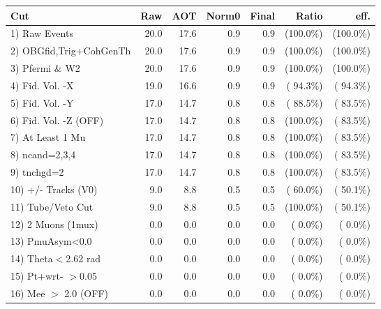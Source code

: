  \begin{table}[h!]\centering
 \begin{tabular}{||l||r|r|r|r|r|r||}
 \hline
 \hline
 Cut & Raw & AOT & Norm0 & Final & Ratio & eff.       \\
 \hline
  1) Raw Events           &         20.0 &         17.6 &          0.9 &          0.9 & (100.0\%) & (100.0\%) \\
  2) OBGfid,Trig+CohGenTh &         20.0 &         17.6 &          0.9 &          0.9 & (100.0\%) & (100.0\%) \\
  3) Pfermi \& W2         &         20.0 &         17.6 &          0.9 &          0.9 & (100.0\%) & (100.0\%) \\
  4) Fid. Vol. -X         &         19.0 &         16.6 &          0.9 &          0.9 & ( 94.3\%) & ( 94.3\%) \\
  5) Fid. Vol. -Y         &         17.0 &         14.7 &          0.8 &          0.8 & ( 88.5\%) & ( 83.5\%) \\
  6) Fid. Vol. -Z (OFF)   &         17.0 &         14.7 &          0.8 &          0.8 & (100.0\%) & ( 83.5\%) \\
  7) At Least 1 Mu        &         17.0 &         14.7 &          0.8 &          0.8 & (100.0\%) & ( 83.5\%) \\
  8) ncand=2,3,4          &         17.0 &         14.7 &          0.8 &          0.8 & (100.0\%) & ( 83.5\%) \\
  9) tnchgd=2             &         17.0 &         14.7 &          0.8 &          0.8 & (100.0\%) & ( 83.5\%) \\
 10) +/- Tracks (V0)      &          9.0 &          8.8 &          0.5 &          0.5 & ( 60.0\%) & ( 50.1\%) \\
 11) Tube/Veto Cut        &          9.0 &          8.8 &          0.5 &          0.5 & (100.0\%) & ( 50.1\%) \\
 12) 2 Muons (1mux)       &          0.0 &          0.0 &          0.0 &          0.0 & (  0.0\%) & (  0.0\%) \\
 13) PmuAsym<0.0          &          0.0 &          0.0 &          0.0 &          0.0 & (  0.0\%) & (  0.0\%) \\
 14) Theta$<$2.62 rad     &          0.0 &          0.0 &          0.0 &          0.0 & (  0.0\%) & (  0.0\%) \\
 15) Pt+wrt- $>$0.05      &          0.0 &          0.0 &          0.0 &          0.0 & (  0.0\%) & (  0.0\%) \\
 16) Mee $>$ 2.0  (OFF)   &          0.0 &          0.0 &          0.0 &          0.0 & (  0.0\%) & (  0.0\%) \\

\end{tabular}
\end{table}
